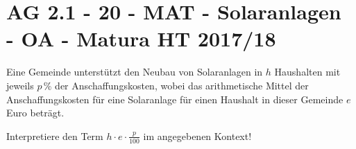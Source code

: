 \section{AG 2.1 - 20 - MAT - Solaranlagen - OA - Matura HT 2017/18}

\begin{beispiel}[AG 2.1]{1} %
Eine Gemeinde unterstützt den Neubau von Solaranlagen in $h$ Haushalten mit jeweils $p\,\%$ der Anschaffungskosten, wobei das arithmetische Mittel der Anschaffungskosten für eine Solaranlage für einen Haushalt in dieser Gemeinde $e$ Euro beträgt.

Interpretiere den Term $h\cdot e\cdot\frac{p}{100}$ im angegebenen Kontext!

\end{beispiel}